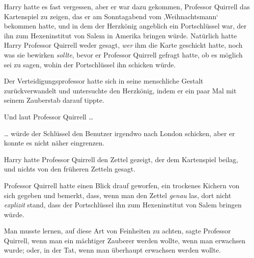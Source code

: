 Harry hatte es fast vergessen, aber er war dazu gekommen, Professor Quirrell das Kartenspiel zu zeigen, das er am Sonntagabend vom ‚Weihnachtsmann‘ bekommen hatte, und in dem der Herzkönig angeblich ein Portschlüssel war, der ihn zum Hexeninstitut von Salem in Amerika bringen würde. Natürlich hatte Harry Professor Quirrell weder gesagt, \emph{wer} ihm die Karte geschickt hatte, noch was sie bewirken \emph{sollte}, bevor er Professor Quirrell gefragt hatte, ob es möglich sei zu sagen, wohin der Portschlüssel ihn schicken würde.

Der Verteidigungsprofessor hatte sich in seine menschliche Gestalt zurückverwandelt und untersuchte den Herzkönig, indem er ein paar Mal mit seinem Zauberstab darauf tippte.

Und laut Professor Quirrell …

… würde der Schlüssel den Benutzer irgendwo nach London schicken, aber er konnte es nicht näher eingrenzen.

Harry hatte Professor Quirrell den Zettel gezeigt, der dem Kartenspiel beilag, und nichts von den früheren Zetteln gesagt.

Professor Quirrell hatte einen Blick drauf geworfen, ein trockenes Kichern von sich gegeben und bemerkt, dass, wenn man den Zettel \emph{genau} las, dort nicht \emph{explizit} stand, dass der Portschlüssel ihn zum Hexeninstitut von Salem bringen würde.

Man musste lernen, auf diese Art von Feinheiten zu achten, sagte Professor Quirrell, wenn man ein mächtiger Zauberer werden wollte, wenn man erwachsen wurde; oder, in der Tat, wenn man überhaupt erwachsen werden wollte.

